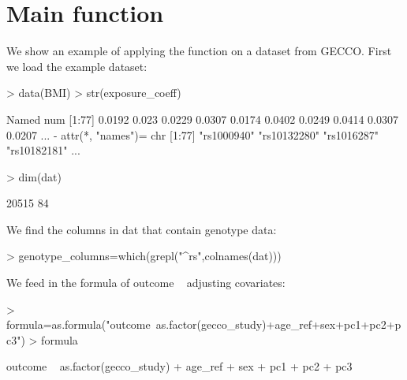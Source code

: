 \documentclass[12pt]{article}
\begin{document}
\section{Main function}

We show an example of applying the function on a dataset from GECCO. 
First we load the example dataset:
\begin{Schunk}
\begin{Sinput}
> data(BMI)
> str(exposure_coeff)
\end{Sinput}
\begin{Soutput}
 Named num [1:77] 0.0192 0.023 0.0229 0.0307 0.0174 0.0402 0.0249 0.0414 0.0307 0.0207 ...
 - attr(*, "names")= chr [1:77] "rs1000940" "rs10132280" "rs1016287" "rs10182181" ...
\end{Soutput}
\begin{Sinput}
> dim(dat)
\end{Sinput}
\begin{Soutput}
[1] 20515    84
\end{Soutput}
\end{Schunk}

We find the columns in dat that contain genotype data:
\begin{Schunk}
\begin{Sinput}
> genotype_columns=which(grepl("^rs",colnames(dat)))
\end{Sinput}
\end{Schunk}

We feed in the formula of outcome ~ adjusting covariates:
\begin{Schunk}
\begin{Sinput}
> formula=as.formula("outcome~as.factor(gecco_study)+age_ref+sex+pc1+pc2+pc3")
> formula
\end{Sinput}
\begin{Soutput}
outcome ~ as.factor(gecco_study) + age_ref + sex + pc1 + pc2 + 
    pc3
\end{Soutput}
\end{Schunk}
\end{document}
